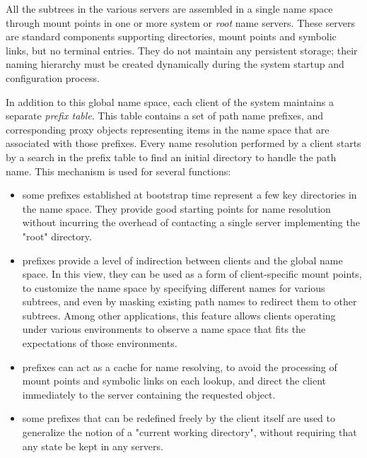 All the subtrees in the various servers are assembled in a single name
space through mount points in one or more system or {\em root} name
servers. These servers are standard components supporting directories,
mount points and symbolic links, but no terminal entries. They do not
maintain any persistent storage; their naming hierarchy must be
created dynamically during the system startup and configuration
process.

In addition to this global name space, each client of the system
maintains a separate {\em prefix table}. This table contains a set of
path name prefixes, and corresponding proxy objects representing items
in the name space that are associated with those prefixes. Every name
resolution performed by a client starts by a search in the prefix
table to find an initial directory to handle the path name. This
mechanism is used for several functions:
\begin{itemize}
\item some prefixes established at bootstrap time represent a few key
directories in the name space. They provide good starting points for
name resolution without incurring the overhead of contacting a single
server implementing the "root" directory.

\item prefixes provide a level of indirection between clients and the
global name space. In this view, they can be used as a form of
client-specific mount points, to customize the name space by
specifying different names for various subtrees, and even by masking
existing path names to redirect them to other subtrees.  Among other
applications, this feature allows clients operating under various
environments to observe a name space that fits the expectations of
those environments.

\item prefixes can act as a cache for name resolving, to avoid the
processing of mount points and symbolic links on each lookup, and
direct the client immediately to the server containing the requested
object.

\item some prefixes that can be redefined freely by the client itself
are used to generalize the notion of a "current working directory",
without requiring that any state be kept in any servers.
\end{itemize}


